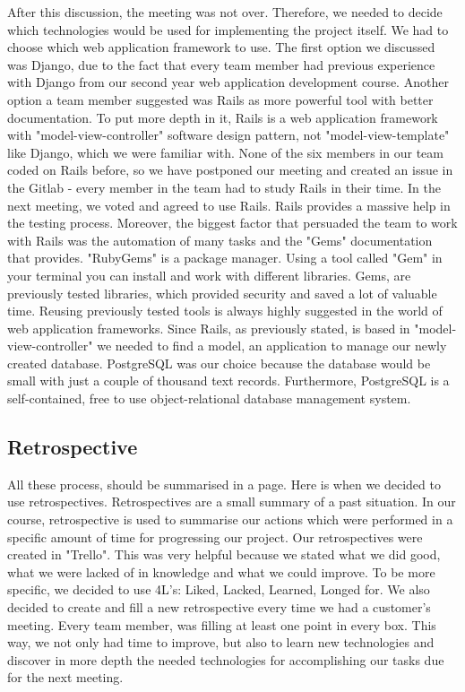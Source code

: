 \documentclass{l3proj}
\begin{document}
 After this discussion, the meeting was not over. Therefore, we needed to decide which technologies would be used for implementing the project itself. We had to choose which web application framework to use. The first option we discussed was Django, due to the fact that every team member had previous experience with Django from our second year web application development course. Another option a team member suggested was Rails as more powerful tool with better documentation. To put more depth in it, Rails is a web application framework with "model-view-controller" software design pattern, not "model-view-template" like Django, which we were familiar with. None of the six members in our team coded on Rails before, so we have postponed our meeting and created an issue in the Gitlab - every member in the team had to study Rails in their time. In the next meeting, we voted and agreed to use Rails. Rails provides a massive help in the testing process. Moreover, the biggest factor that persuaded the team to work with Rails was the automation of many tasks and the "Gems" documentation that provides. "RubyGems" is a package manager. Using a tool called "Gem" in your terminal you can install and work with different libraries. Gems, are previously tested libraries, which provided security and saved a lot of valuable time. Reusing previously tested tools is always highly suggested in the world of web application frameworks.
  Since Rails, as previously stated, is based in "model-view-controller" we needed to find a model, an application to manage our newly created database. PostgreSQL was our choice because the database would be small with just a couple of thousand text records. Furthermore, PostgreSQL is a self-contained, free to use object-relational database management system.
 
 \subsection{Retrospective}
\label{retrospective}
 
 All these process, should be summarised in a page. Here is when we decided to use retrospectives. Retrospectives are a small summary of a past situation. In our course, retrospective is used to summarise our actions which were performed in a specific amount of time for progressing our project. Our retrospectives were created in "Trello". This was very helpful because we stated what we did good, what we were lacked of in knowledge and what we could improve. To be more specific, we decided to use 4L's: Liked, Lacked, Learned, Longed for. We also decided to create and fill a new retrospective every time we had a customer's meeting. Every team member, was filling at least one point in every box. This way, we not only had time to improve, but also to learn new technologies and discover in more depth the needed technologies for accomplishing our tasks due for the next meeting.
\end{document}
